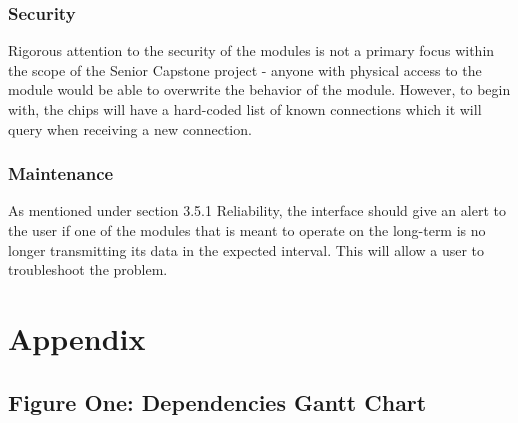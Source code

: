 \documentclass[onecolumn, draftclsnofoot,10pt, compsoc]{IEEEtran}
\begin{document}
		\subsubsection{Security}
		Rigorous attention to the security of the modules is not a primary focus within the scope of the Senior Capstone project - anyone with physical access to the module would be able to overwrite the behavior of the module. However, to begin with, the chips will have a hard-coded list of known connections which it will query when receiving a new connection.

		\subsubsection{Maintenance}
		As mentioned under section 3.5.1 Reliability, the interface should give an alert to the user if one of the modules that is meant to operate on the long-term is no longer transmitting its data in the expected interval. This will allow a user to troubleshoot the problem.

\newpage

\section{Appendix}
	\subsection{Figure One: Dependencies Gantt Chart}
		\noindent{}
	
\end{document}

